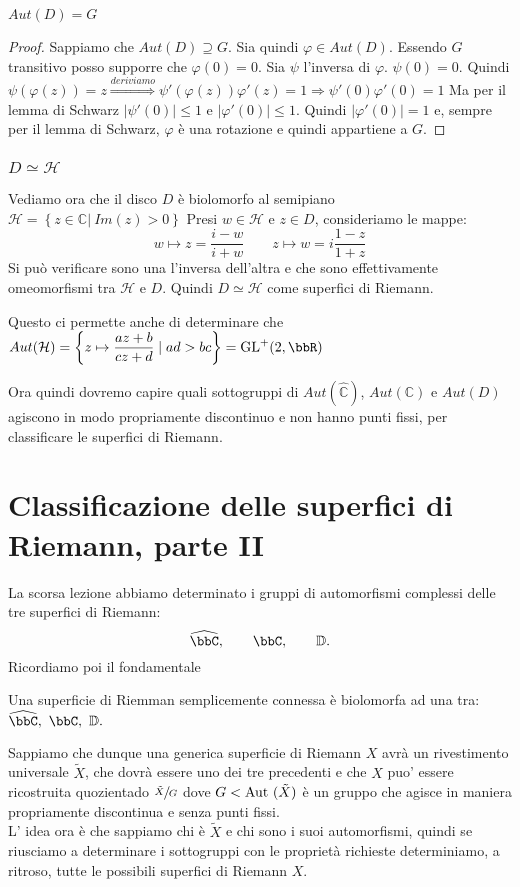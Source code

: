 \begin{proposizione}
$Aut(D)=G$
\end{proposizione}
\begin{proof}
Sappiamo che $Aut(D) \supseteq G$. Sia quindi $\varphi \in Aut(D)$. Essendo $G$ transitivo posso supporre che $\varphi(0)=0$.
Sia $\psi$ l'inversa di $\varphi$. $\psi (0)=0$. Quindi
$\psi (\varphi (z))=z \stackrel{deriviamo}{\Longrightarrow} \psi ' (\varphi (z)) \varphi '(z) =1 \Rightarrow \psi'(0) \varphi'(0) =1$
Ma per il lemma di Schwarz $|\psi'(0)| \leq 1$ e $|\varphi'(0)| \leq 1$. Quindi $|\varphi'(0)|=1$ e, sempre per il lemma di Schwarz,
$\varphi$ è una rotazione e quindi appartiene a $G$.
\end{proof}

\subsection {$D \simeq \mathcal{H}$}

Vediamo ora che il disco $D$ è biolomorfo al semipiano $\mathcal{H} = \left \{ z \in \mathbb{C} | \ Im (z)>0 \right \}$
Presi $w \in \mathcal{H}$ e $z \in D$, consideriamo le mappe:
$$w \mapsto z=\frac{i-w}{i+w} \qquad z \mapsto w= i\frac{1-z}{1+z}$$
Si può verificare sono una l'inversa dell'altra e che sono effettivamente omeomorfismi tra $\mathcal{H}$ e $D$.
Quindi $D \simeq \mathcal{H}$ come superfici di Riemann.

Questo ci permette anche di determinare che $Aut( \mathcal{H}) = \left \{ z \mapsto \displaystyle{\frac{az+b}{cz+d}} \mid ad > bc \right \} = \GL^+ (2, \bbR)$

Ora quindi dovremo capire quali sottogruppi di $Aut (\hat{\mathbb{C}})$, $Aut(\mathbb{C})$ e $Aut(D)$ agiscono in modo propriamente discontinuo
e non hanno punti fissi, per classificare le superfici di Riemann.


\chapter{Classificazione delle superfici di Riemann, parte II}

La scorsa lezione abbiamo determinato i gruppi di automorfismi complessi delle tre superfici di Riemann:
$$
\hat{\bbC},\qquad \bbC, \qquad \mathbb{D}.
$$
Ricordiamo poi il fondamentale
\begin{teorema}[Riemann] Una superficie di Riemman semplicemente connessa è biolomorfa ad una tra:
$\hat{\bbC},\ \bbC, \ \mathbb{D}. $
\end{teorema}
Sappiamo che dunque una generica superficie di Riemann $X$ avrà un rivestimento universale $\tilde{X}$, che dovrà essere uno dei tre precedenti e che $X$ puo' essere ricostruita quozientado $\sfrac{\tilde{X}}{G}$ dove $G<\text{Aut }(\tilde{X})$ è un gruppo che agisce in maniera propriamente discontinua e senza punti fissi.\\
L' idea ora è che sappiamo chi è $\tilde{X}$ e chi sono i suoi automorfismi, quindi se riusciamo a determinare i sottogruppi con le proprietà richieste determiniamo, a ritroso, tutte le possibili superfici di Riemann $X$.\\

